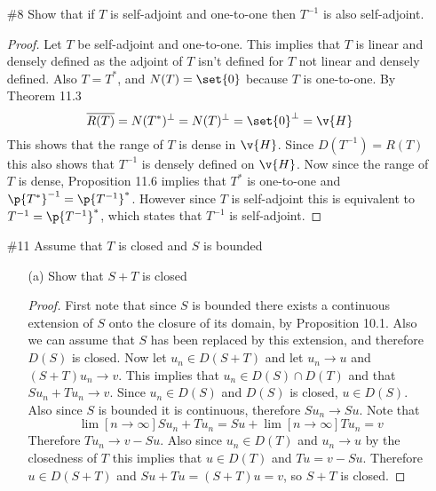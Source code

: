 \documentclass[11pt, oneside]{article}
\begin{document}
\begin{enumerate}
  \pagebreak
  \item[\#8] %
    Show that if $T$ is self-adjoint and one-to-one then $T^{-1}$ is also
    self-adjoint.

    \begin{proof}
      Let $T$ be self-adjoint and one-to-one.
      This implies that $T$ is linear and densely defined as the adjoint of $T$
      isn't defined for $T$ not linear and densely defined.
      Also $T = T^*$, and $N(T) = \set{0}$ because $T$ is one-to-one.
      By Theorem 11.3
      \[
        \overline{R(T)} = N(T^*)^{\perp} = N(T)^{\perp} = \set{0}^{\perp} = \v{H}
      \]
      This shows that the range of $T$ is dense in $\v{H}$.
      Since $D(T^{-1}) = R(T)$ this also shows that $T^{-1}$ is densely defined
      on $\v{H}$.
      Now since the range of $T$ is dense, Proposition 11.6 implies that
      $T^*$ is one-to-one and $\p{T^*}^{-1} = \p{T^{-1}}^*$.
      However since $T$ is self-adjoint this is equivalent to
      $T^{-1} = \p{T^{-1}}^*$, which states that $T^{-1}$ is self-adjoint.
    \end{proof}

  \pagebreak
  \item[\#11] %
    Assume that $T$ is closed and $S$ is bounded
    \begin{enumerate}
      \item[(a)]
        Show that $S + T$ is closed

        \begin{proof}
          First note that since $S$ is bounded there exists a continuous
          extension of $S$ onto the closure of its domain, by Proposition 10.1.
          Also we can assume that $S$ has been replaced by this extension, and
          therefore $D(S)$ is closed.
          Now let $u_n \in D(S + T)$ and let $u_n \to u$ and $(S + T)u_n \to v$.
          This implies that $u_n \in D(S) \cap D(T)$ and that $Su_n + Tu_n \to v$.
          Since $u_n \in D(S)$ and $D(S)$ is closed, $u \in D(S)$.
          Also since $S$ is bounded it is continuous, therefore $Su_n \to Su$.
          Note that
          \[
            \lim[n \to \infty]{Su_n + Tu_n} = Su + \lim[n \to \infty]{Tu_n} = v
          \]
          Therefore $Tu_n \to v - Su$.
          Also since $u_n \in D(T)$ and $u_n \to u$ by the closedness of $T$
          this implies that $u \in D(T)$ and $Tu = v - Su$.
          Therefore $u \in D(S + T)$ and $Su + Tu = (S + T)u = v$, so $S + T$
          is closed.
        \end{proof}


\end{enumerate}
\end{enumerate}
\end{document}
